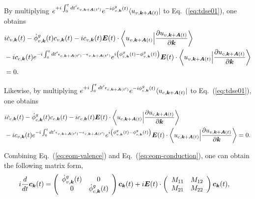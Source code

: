 By multiplying $e^{+i\int^t_0dt' \epsilon_{v,\boldsymbol k+ \boldsymbol A(t')}} e^{-i\phi^g_{v,\boldsymbol k}(t)} \langle u_{v,\boldsymbol k+\boldsymbol A(t)}|$ to Eq.~(\ref{eq:tdse01}), one obtains
\begin{align}
	 & i \dot c_{v,\boldsymbol k}(t) - \dot \phi^g_{v,\boldsymbol k}(t) c_{v,\boldsymbol k}(t) - i c_{v,\boldsymbol k}(t) \boldsymbol E(t)\cdot \left \langle u_{v,\boldsymbol k+\boldsymbol A(t)}\Big |\frac{\partial u_{v,\boldsymbol k+\boldsymbol A(t)}}{\partial \boldsymbol k} \right \rangle \nonumber \\
	 & - i c_{c,\boldsymbol k}(t) e^{-i\int^t_0dt' \epsilon_{c,\boldsymbol k+ \boldsymbol A(t')}-\epsilon_{v,\boldsymbol k+ \boldsymbol A(t')}} e^{i\left (\phi^g_{c,\boldsymbol k}(t)-\phi^g_{v,\boldsymbol k}(t)\right )}
	\boldsymbol E(t)\cdot \left \langle u_{v,\boldsymbol k+\boldsymbol A(t)}\Big |\frac{\partial u_{c,\boldsymbol k+\boldsymbol
	A(t)}}{\partial \boldsymbol k} \right \rangle                                                                                                                                                                                                       \\& = 0.
	\label{eq:eom-valence}
\end{align}

Likewise, by multiplying $e^{+i\int^t_0dt' \epsilon_{c,\boldsymbol k+ \boldsymbol A(t')}} e^{-i\phi^g_{c,\boldsymbol k}(t)} \langle u_{c,\boldsymbol k+\boldsymbol A(t)}|$ to Eq.~(\ref{eq:tdse01}), one obtains
\begin{align}
	 & i \dot c_{c,\boldsymbol k}(t) - \dot \phi^g_{c,\boldsymbol k}(t) c_{c,\boldsymbol k}(t) - i c_{c,\boldsymbol k}(t) \boldsymbol E(t)\cdot \left \langle u_{c,\boldsymbol k+\boldsymbol A(t)}\Big |\frac{\partial u_{c,\boldsymbol k+\boldsymbol A(t)}}{\partial \boldsymbol k} \right \rangle \nonumber \\
	 & - i c_{v,\boldsymbol k}(t) e^{-i\int^t_0dt' \epsilon_{v,\boldsymbol k+ \boldsymbol A(t')}-\epsilon_{c,\boldsymbol k+ \boldsymbol A(t')}} e^{i\left (\phi^g_{v,\boldsymbol k}(t)-\phi^g_{c,\boldsymbol k}(t)\right )}
	\boldsymbol E(t)\cdot \left \langle u_{c,\boldsymbol k+\boldsymbol A(t)}\Big |\frac{\partial u_{v,\boldsymbol k+\boldsymbol A(t)}}{\partial \boldsymbol k} \right \rangle = 0.
	\label{eq:eom-conduction}
\end{align}

Combining Eq.~(\ref{eq:eom-valence}) and Eq.~(\ref{eq:eom-conduction}), one can obtain the following matrix form,
\begin{align}
	 & i\frac{d}{dt} \boldsymbol c_{\boldsymbol k}(t) =
	\left(
	\begin{array}{cc}
			\dot \phi^g_{v,\boldsymbol k}(t) &
			0                            \\
			0                          &
			\dot \phi^g_{c,\boldsymbol k}(t)
		\end{array}
	\right) \boldsymbol c_{\boldsymbol k}(t)
	+i\boldsymbol E(t)\cdot \left(
	\begin{array}{cc}
			M_{11} & M_{12} \\
			M_{21} & M_{22}
		\end{array}
	\right) \boldsymbol c_{\boldsymbol k}(t),
\end{align}

